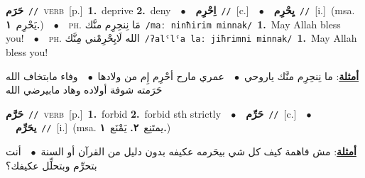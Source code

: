 \documentclass[10pt,a4paper,twoside]{article} %
\begin{document}
\begin{multicols}{2}
{\setlength\topsep{0pt}\textbf{\foreignlanguage{arabic}{حَرَم}}\ {\color{gray}\texttt{//}\color{black}}\ \textsc{verb}\ [p.]\ \textbf{1.}~deprive  \textbf{2.}~deny\ \ $\bullet$\ \ \setlength\topsep{0pt}\textbf{\foreignlanguage{arabic}{اِحْرِم}}\ {\color{gray}\texttt{//}\color{black}}\ [c.]\ \ $\bullet$\ \ \setlength\topsep{0pt}\textbf{\foreignlanguage{arabic}{يِحْرِم}}\ {\color{gray}\texttt{//}\color{black}}\ [i.]\ \color{gray}(msa. \foreignlanguage{arabic}{يَحْرِم}~\foreignlanguage{arabic}{\textbf{١.}})\color{black}\ \ $\bullet$\ \ \textsc{ph.} \color{gray} \foreignlanguage{arabic}{مَا نِنحِرِم منَّك}\color{black}\ {\color{gray}\texttt{/{\sffamily maː ninħirim minnak}/}\color{black}}\ \textbf{1.}~May Allah bless you!\ \ $\bullet$\ \ \textsc{ph.} \color{gray} \foreignlanguage{arabic}{الله لَايِحْرِمْني مِنَّك}\color{black}\ {\color{gray}\texttt{/{\sffamily ʔalˤlˤa laː jiħrimni minnak}/}\color{black}}\ \textbf{1.}~May Allah bless you!\  \begin{flushright}\color{gray}\foreignlanguage{arabic}{\textbf{\underline{\foreignlanguage{arabic}{أمثلة}}}: ما نِنحِرِم منَّك ياروحي\ $\bullet$\ \  عمري مارح أحْرِم إِم من ولادها\ $\bullet$\ \  وفاء مابتخاف الله حَرَمته شوفة أولاده وهاد مابيرضي الله}\end{flushright}\color{black}} \vspace{2mm}

{\setlength\topsep{0pt}\textbf{\foreignlanguage{arabic}{حَرَّم}}\ {\color{gray}\texttt{//}\color{black}}\ \textsc{verb}\ [p.]\ \textbf{1.}~forbid  \textbf{2.}~forbid sth strictly\ \ $\bullet$\ \ \setlength\topsep{0pt}\textbf{\foreignlanguage{arabic}{حَرِّم}}\ {\color{gray}\texttt{//}\color{black}}\ [c.]\ \ $\bullet$\ \ \setlength\topsep{0pt}\textbf{\foreignlanguage{arabic}{يحَرِّم}}\ {\color{gray}\texttt{//}\color{black}}\ [i.]\ \color{gray}(msa. \foreignlanguage{arabic}{يمتَنِع}~\foreignlanguage{arabic}{\textbf{٢.}}  \foreignlanguage{arabic}{يَمْنَع}~\foreignlanguage{arabic}{\textbf{١.}})\color{black}\  \begin{flushright}\color{gray}\foreignlanguage{arabic}{\textbf{\underline{\foreignlanguage{arabic}{أمثلة}}}: مش فاهمة كيف كل شي بيحَرمه عكيفه بدون دليل من القرآن أو السنة\ $\bullet$\ \  أنت بتحرِّم وبتحلِّل عكيفك؟}\end{flushright}\color{black}} \vspace{2mm}


\end{multicols}
\end{document}
